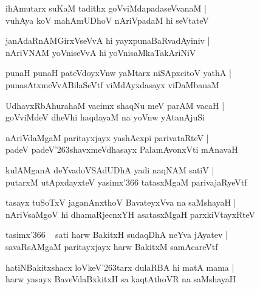 \documentclass[twoside,12pt,openright]{book}
\def\S{\char'263}
\newcounter{shloka}[chapter]
\begin{document}
\begin{shloka}
ihAmutarx suKaM tadithx goVviMdapadaseVvanaM |\\
vuhAya koV mahAmUDhoV nAriVpadaM hi seVtateV 
\end{shloka}

\begin{shloka}
janAdaRnAMGirxVseVvA hi yayxpunaBaRvadAyiniv |\\
nAriVNAM yoVniseVvA hi yoVnisaMkaTakAriNiV 
\end{shloka}

\begin{shloka}
punaH punaH pateVdoyxVnw yaMtarx niSApxcitoV yathA |\\
punasAtxmeVvABilaSeVtf viMdAyxdasayx viDaMbanaM 
\end{shloka}

\begin{shloka}
UdhavxRbAhurahaM vacimx shaqNu meV parAM vacaH |\\
goVviMdeV dheVhi haqdayaM na yoVnw yAtanAjuSi 
\end{shloka}

\begin{shloka}
nAriVdaMgaM paritayxjayx yashAcxpi parivataRteV |\\
padeV padeV\S shavxmeVdhasayx PalamAvonxVti mAnavaH 
\end{shloka}

\begin{shloka}
kulAMganA deYvadoVSAdUDhA yadi naqNAM satiV |\\
putarxM utApxdayxteV yasimx\char'366 tatasxMgaM parivajaRyeVtf 
\end{shloka}

\begin{shloka}
tasayx tuSoTxV jaganAnxthoV BavateyxVva na saMshayaH |\\
nAriVsaMgoV hi dhamaRjecnxYH asatasxMgaH parxkiVtayxRteV 
\end{shloka}

\begin{shloka}
tasimx\char'366 ~ sati harw BakitxH sudaqDhA neYva jAyatev |\\
savaRsAMgaM paritayxjayx harw BakitxM samAcareVtf
\end{shloka}

\begin{shloka}
hatiNBakitxshacx loVkeV\S tarx dulaRBA hi matA mama |\\
harw yasayx BaveVdaBxkitxH sa kaqtAthoVR na saMshayaH 
\end{shloka}
\end{document}
